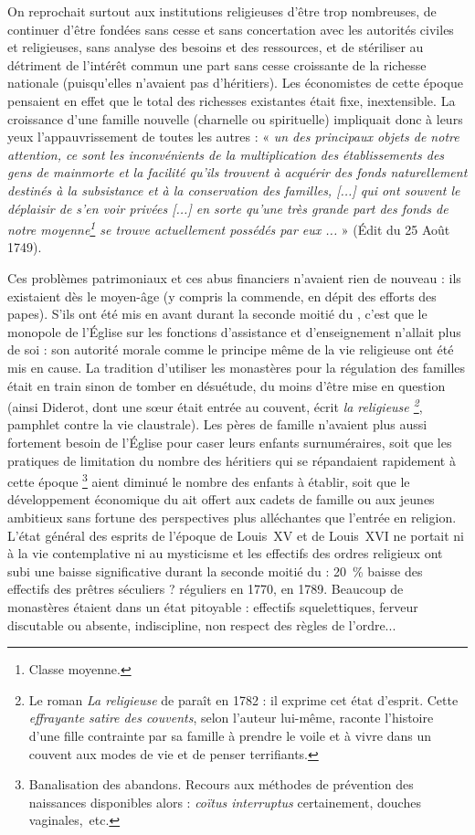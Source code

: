 On reprochait surtout aux institutions religieuses d'être trop nombreuses, de continuer d'être fondées sans cesse et sans concertation avec les autorités civiles et religieuses, sans analyse des besoins et des ressources, et de stériliser au détriment de l'intérêt commun une part sans cesse croissante de la richesse nationale (puisqu'elles n'avaient pas d'héritiers). Les économistes de cette époque pensaient en effet que le total des richesses existantes était fixe, inextensible. La croissance d'une famille nouvelle (charnelle ou spirituelle) impliquait donc à leurs yeux l'appauvrissement de toutes les autres : « \emph{un des principaux objets de notre attention, ce sont les inconvénients de la multiplication des établissements des gens de mainmorte et la facilité qu'ils trouvent à acquérir des fonds naturellement destinés à la subsistance et à la conservation des familles, \emph{[...]} qui ont souvent le déplaisir de s'en voir privées \emph{[...]} en sorte qu'une très grande part des fonds de notre moyenne\footnote{Classe moyenne.} se trouve actuellement possédés par eux ...} » (Édit du 25 Août 1749). 

 Ces problèmes patrimoniaux et ces abus financiers n'avaient rien de nouveau : ils existaient dès le moyen-âge (y compris la commende, en dépit des efforts des papes). S'ils ont été mis en avant durant la seconde moitié du , c'est que le monopole de l'Église sur les fonctions d'assistance et d'enseignement n'allait plus de soi : son autorité morale comme le principe même de la vie religieuse ont été mis en cause. La tradition d'utiliser les monastères pour la régulation des familles était en train sinon de tomber en désuétude, du moins d'être mise en question (ainsi Diderot, dont une sœur était entrée au couvent, écrit \emph{la religieuse 
\footnote{Le roman \emph{La religieuse} de  paraît en 1782 : il exprime cet état d'esprit. Cette \emph{effrayante satire des couvents}, selon l'auteur lui-même, raconte l'histoire d'une fille contrainte par sa famille à prendre le voile et à vivre dans un couvent aux modes de vie et de penser terrifiants.}}, pamphlet contre la vie claustrale). Les pères de famille n'avaient plus aussi fortement besoin de l'Église pour caser leurs enfants surnuméraires, soit que les pratiques de limitation du nombre des héritiers qui se répandaient rapidement à cette époque%
\footnote{Banalisation des abandons. Recours aux méthodes de prévention des naissances disponibles alors : \emph{coïtus interruptus} certainement, douches vaginales,~etc.} 
aient diminué le nombre des enfants à établir, soit que le développement économique du  ait offert aux cadets de famille ou aux jeunes ambitieux sans fortune des perspectives plus alléchantes que l'entrée en religion. L'état général des esprits de l'époque de Louis~XV et de Louis~XVI ne portait ni à la vie contemplative ni au mysticisme et les effectifs des ordres religieux ont subi une baisse significative durant la seconde moitié du  : 20~\% baisse des effectifs des prêtres séculiers ?  réguliers en 1770,  en 1789. Beaucoup de monastères étaient dans un état pitoyable : effectifs squelettiques, ferveur discutable ou absente, indiscipline, non respect des règles de l'ordre... 

